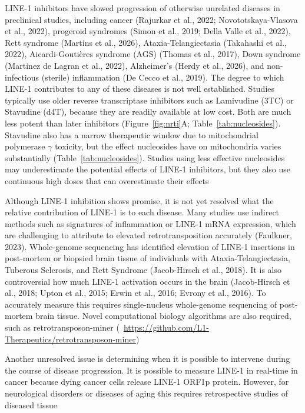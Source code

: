 \documentclass[11pt,twocolumn,twoside]{extarticle}
\begin{document}
LINE-1 inhibitors have slowed progression of otherwise unrelated diseases in preclinical studies, including cancer (Rajurkar et al., 2022; Novototskaya-Vlasova et al., 2022), progeroid syndromes (Simon et al., 2019; Della Valle et al., 2022), Rett syndrome (Martins et al., 2026), Ataxia-Telangiectasia (Takahashi et al., 2022), Aicardi-Gouti\`eres syndrome (AGS) (Thomas et al., 2017), Down syndrome (Martinez de Lagran et al., 2022), Alzheimer's (Herdy et al., 2026), and non-infectious (sterile) inflammation (De Cecco et al., 2019). The degree to which LINE-1 contributes to any of these diseases is not well established. Studies typically use older reverse transcriptase inhibitors such as Lamivudine (3TC) or Stavudine (d4T), because they are readily available at low cost. Both are much less potent than later inhibitors (Figure~\ref{fig:nrti}A; Table~\ref{tab:nucleosides}). Stavudine also has a narrow therapeutic window due to mitochondrial polymerase $\gamma$ toxicity, but the effect nucleosides have on mitochondria varies substantially (Table~\ref{tab:nucleosides}). Studies using less effective nucleosides may underestimate the potential effects of LINE-1 inhibitors, but they also use continuous high doses that can overestimate their effects

Although LINE-1 inhibition shows promise, it is not yet resolved what the relative contribution of LINE-1 is to each disease. Many studies use indirect methods such as signatures of inflammation or LINE-1 mRNA expression, which are challenging to attribute to elevated retrotransposition accurately (Faulkner, 2023). Whole-genome sequencing has identified elevation of LINE-1 insertions in post-mortem or biopsied brain tissue of individuals with Ataxia-Telangiectasia, Tuberous Sclerosis, and Rett Syndrome (Jacob-Hirsch et al., 2018). It is also controversial how much LINE-1 activation occurs in the brain (Jacob-Hirsch et al., 2018; Upton et al., 2015; Erwin et al., 2016; Evrony et al., 2016). To accurately measure this requires single-nucleus whole-genome sequencing of post-mortem brain tissue. Novel computational biology algorithms are also required, such as retrotransposon-miner (\href{https://github.com/L1-Therapeutics/retrotransposon-miner}{\faGithub}~\url{https://github.com/L1-Therapeutics/retrotransposon-miner})

Another unresolved issue is determining when it is possible to intervene during the course of disease progression. It is possible to measure LINE-1 in real-time in cancer because dying cancer cells release LINE-1 ORF1p protein. However, for neurological disorders or diseases of aging this requires retrospective studies of diseased tissue
\end{document}
